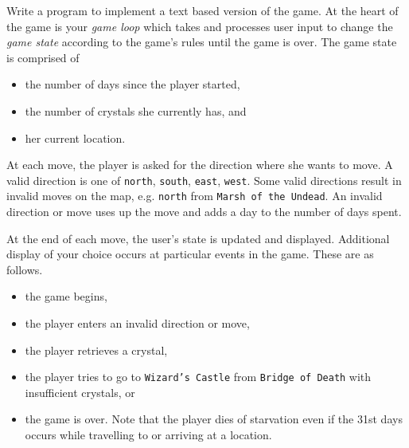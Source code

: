 \documentclass[addpoints]{exam}
\begin{document}
\begin{questions}
Write a program to implement a text based version of the game. At the heart of the game is your {\it game loop} which takes and processes user input to change the {\it game state} according to the game's rules until the game is over. The game state is comprised of
\begin{itemize}
\item the number of days since the player started,
\item the number of crystals she currently has, and
\item her current location.
\end{itemize}

At each move, the player is asked for the direction where she wants to move. A valid direction is one of  {\tt north}, {\tt south}, {\tt east}, {\tt west}. Some valid directions result in invalid moves on the map, e.g. {\tt north} from {\tt Marsh of the Undead}. An invalid direction or move uses up the move and adds a day to the number of days spent.

At the end of each move, the user's state is updated and displayed. Additional display of your choice occurs at particular events in the game. These are as follows.
\begin{itemize}
\item the game begins,
\item the player enters an invalid direction or move,
\item the player retrieves a crystal,
\item the player tries to  go to {\tt Wizard's Castle} from {\tt Bridge of Death} with insufficient crystals, or
\item the game is over. Note that the player dies of starvation even if the 31st days occurs while travelling to or arriving at a location.
\end{itemize}

\label{sec:map}


\end{questions}
\end{document}
